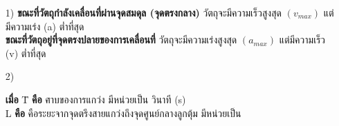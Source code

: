 \tcblower
\begin{itemize}[leftmargin=*]
	\item[1)] 	\textbf{ขณะที่วัตถุกำลังเคลื่อนที่ผ่านจุดสมดุล (จุดตรงกลาง)}  วัตถุจะมีความเร็วสูงสุด $(v_{max})$  แต่มีความเร่ง (a)  ต่ำที่สุด \\
				\textbf{ขณะที่วัตถุอยู่ที่จุดตรงปลายของการเคลื่อนที่}  วัตถุจะมีความเร่งสูงสุด $(a_{max})$  แต่มีความเร็ว (v) ต่ำที่สุด	
	\item[2)] 	 \hfill
				\begin{tabbing}
					\textbf{เมื่อ} \quad 	\=T \quad 	\=\textbf{คือ} 	\=คาบของการแกว่ง  มีหน่วยเป็น วินาที (s) \\
										\>L 		\>\textbf{คือ} 	\>คือระยะจากจุดตรึงสายแกว่งถึงจุดศูนย์กลางลูกตุ้ม มีหน่วยเป็น \\

\end{tabbing}
\end{itemize}
